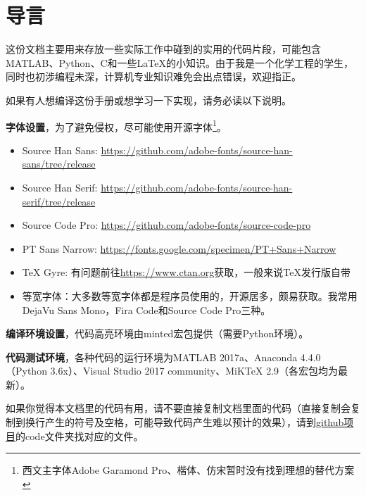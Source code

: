 \chapter*{导言}

这份文档主要用来存放一些实际工作中碰到的实用的代码片段，可能包含MATLAB、Python、C和一些\LaTeX{}的小知识。由于我是一个化学工程的学生，同时也初涉编程未深，计算机专业知识难免会出点错误，欢迎指正。

如果有人想编译这份手册或想学习一下实现，请务必读以下说明。

\textbf{字体设置}，为了避免侵权，尽可能使用开源字体\footnote{西文主字体Adobe Garamond Pro、楷体、仿宋暂时没有找到理想的替代方案}。

\begin{itemize}
\item Source Han Sans: \url{https://github.com/adobe-fonts/source-han-sans/tree/release}
\item Source Han Serif: \url{https://github.com/adobe-fonts/source-han-serif/tree/release}
\item Source Code Pro: \url{https://github.com/adobe-fonts/source-code-pro}
\item PT Sans Narrow: \url{https://fonts.google.com/specimen/PT+Sans+Narrow}
\item TeX Gyre: 有问题前往\url{https://www.ctan.org}获取，一般来说\TeX{}发行版自带
\item 等宽字体：大多数等宽字体都是程序员使用的，开源居多，颇易获取。我常用DejaVu Sans Mono，Fira Code和Source Code Pro三种。
\end{itemize}

\begin{TeXcode}
\usepackage{fontspec}
    \setmainfont{Adobe Garamond Pro}  %
    \setsansfont{TeX Gyre Heros}
    \setmonofont{Source Code Pro}  %

\usepackage{unicode-math}

\newfontfamily{}
\end{TeXcode}

\textbf{编译环境设置}，代码高亮环境由minted宏包提供（需要Python环境）。

\textbf{代码测试环境}，各种代码的运行环境为MATLAB 2017a、Anaconda 4.4.0（Python 3.6x）、Visual Studio 2017 community、MiK\TeX{} 2.9（各宏包均为最新）。

如果你觉得本文档里的代码有用，请不要直接复制文档里面的代码（直接复制会复制到换行产生的符号及空格，可能导致代码产生难以预计的效果），请到\href{https://github.com/Zousiyu/code_snippet}{github项目}的code文件夹找对应的文件。